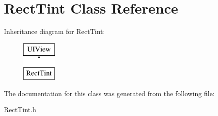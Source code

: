\hypertarget{interface_rect_tint}{\section{Rect\+Tint Class Reference}
\label{interface_rect_tint}
}
Inheritance diagram for Rect\+Tint\+:\begin{figure}[H]
\begin{center}
\leavevmode
\includegraphics[height=2.000000cm]{interface_rect_tint}
\end{center}
\end{figure}


The documentation for this class was generated from the following file\+:\begin{DoxyCompactItemize}
\item 
Rect\+Tint.\+h\end{DoxyCompactItemize}
